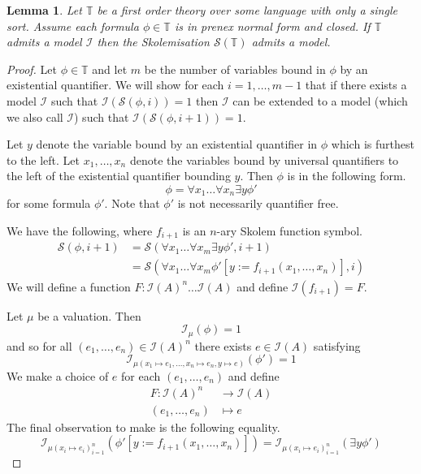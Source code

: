 \documentclass[12pt]{article}
\theoremstyle{plain}
\newtheorem{lemma}[thm]{Lemma}
\theoremstyle{definition}
\newcommand{\bb}[1]{\mathbb{#1}}
\newcommand{\call}[1]{\mathcal{#1}}
\newcommand{\lto}{\longrightarrow}
\begin{document}
	\begin{lemma}\label{lem:extend_to_skolem}
		Let $\bb{T}$ be a first order theory over some language with only a single sort. Assume each formula $\phi \in \bb{T}$ is in prenex normal form and closed. If $\bb{T}$ admits a model $\call{I}$ then the Skolemisation $\call{S}(\bb{T})$ admits a model.
		\end{lemma}
	\begin{proof}
		Let $\phi \in \bb{T}$ and let $m$ be the number of variables bound in $\phi$ by an existential quantifier. We will show for each $i = 1, \ldots, m-1$ that if there exists a model $\call{I}$ such that $\call{I}(\call{S}(\phi, i)) = 1$ then $\call{I}$ can be extended to a model (which we also call $\call{I}$) such that $\call{I}(\call{S}(\phi, i+ 1)) = 1$.
		
		Let $y$ denote the variable bound by an existential quantifier in $\phi$ which is furthest to the left. Let $x_1, \ldots, x_n$ denote the variables bound by universal quantifiers to the left of the existential quantifier bounding $y$. Then $\phi$ is in the following form.
		\begin{equation}
			\phi = \forall x_1 \ldots \forall x_n \exists y \phi'
			\end{equation}
		for some formula $\phi'$. Note that $\phi'$ is not necessarily quantifier free.
		
		We have the following, where $f_{i+1}$ is an $n$-ary Skolem function symbol.
		\begin{align*}
			\call{S}(\phi, i + 1) &= \call{S}(\forall x_1 \ldots \forall x_m \exists y \phi', i+1)\\
			&= \call{S}(\forall x_1 \ldots \forall x_m \phi'[y := f_{i+1}(x_1, \ldots, x_n)], i)
			\end{align*}
		We will define a function $F: \call{I}(A)^n \ldots \call{I}(A)$ and define $\call{I}(f_{i+1}) = F$.
		
		Let $\mu$ be a valuation. Then
		\begin{equation}
			\call{I}_\mu(\phi) = 1
			\end{equation}
		and so for all $(e_1,\ldots, e_n)\in \call{I}(A)^n$ there exists $e \in \call{I}(A)$ satisfying
		\begin{equation}
			\call{I}_{\mu(x_1 \mapsto e_1, \ldots, x_n \mapsto e_n, y \mapsto e)}(\phi') = 1
			\end{equation}
		We make a choice of $e$ for each $(e_1, \ldots, e_n)$ and define
		\begin{align*}
			F: \call{I}(A)^n & \lto \call{I}(A)\\
			(e_1,\ldots, e_n) &\longmapsto e
			\end{align*}
		The final observation to make is the following equality.
		\begin{equation}
			\call{I}_{\mu(x_i \mapsto e_i)_{i = 1}^n}(\phi'[y := f_{i+1}(x_1,\ldots, x_n)]) = \call{I}_{\mu(x_i \mapsto e_i)_{i = 1}^n}(\exists y \phi')
			\end{equation}
		\end{proof}
	
\end{document}
